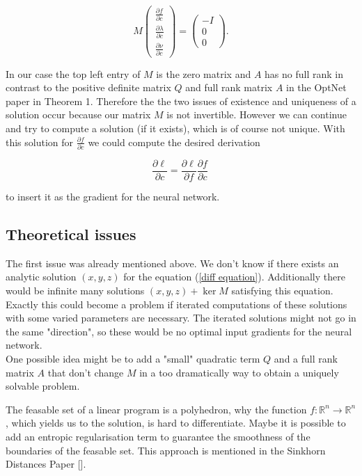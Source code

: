\documentclass{article}
\begin{document}
\[
M \begin{pmatrix} \frac{\partial f}{\partial c} \\[4pt] \frac{\partial\lambda}{\partial c} \\[4pt] \frac{\partial \nu}{\partial c} \end{pmatrix}
= 
\begin{pmatrix} -I \\ 0 \\ 0 \end{pmatrix}.
\]

In our case the top left entry of $M$ is the zero matrix and $A$ has no full rank in contrast to the positive definite matrix $Q$ and full rank matrix $A$ in the OptNet paper in Theorem 1. Therefore the the two issues of existence and uniqueness of a solution occur because our matrix $M$ is not invertible. However we can continue and try to compute a solution (if it exists), which is of course not unique. With this solution for $\frac{\partial f}{\partial c}$ we could compute the desired derivation

\[
\frac{\partial \ell }{\partial c} = \frac{\partial \ell}{\partial f} \frac{\partial f}{\partial c}~
\]

to insert it as the gradient for the neural network. 

\subsection{Theoretical issues}

The first issue was already mentioned above. We don't know if there exists an analytic solution $(x,y,z)$ for the equation (\ref*{diff equation}). Additionally there would be infinite many solutions $(x,y,z)+ \ker M$ satisfying this equation. Exactly this could become a problem if iterated computations of these solutions with some varied parameters are necessary. The iterated solutions might not go in the same "direction", so these would be no optimal input gradients for the neural network. \\
One possible idea might be to add a "small" quadratic term $Q$ and a full rank matrix $A$ that don't change $M$ in a too dramatically way to obtain a uniquely solvable problem.

The feasable set of a linear program is a polyhedron, why the function $f:\mathbb R^n \rightarrow \mathbb R^n$, which yields us to the solution, is hard to differentiate. Maybe it is possible to add an entropic regularisation term to guarantee the smoothness of the boundaries of the feasable set. This approach is mentioned in the Sinkhorn Distances Paper []. 
\end{document}
